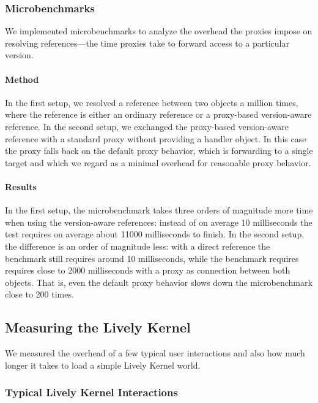 \subsubsection{Microbenchmarks}

We implemented microbenchmarks to analyze the overhead the proxies impose on resolving references---the time proxies take to forward access to a particular version.

\paragraph{Method}
In the first setup, we resolved a reference between two objects a million times, where the reference is either an ordinary reference or a proxy-based version-aware reference.
In the second setup, we exchanged the proxy-based version-aware reference with a standard proxy without providing a handler object.
In this case the proxy falls back on the default proxy behavior, which is forwarding to a single target and which we regard as a minimal overhead for reasonable proxy behavior. 

\paragraph{Results}
In the first setup, the microbenchmark takes three orders of magnitude more time when using the version-aware references: instead of on average 10 milliseconds the test requires on average about 11000 milliseconds to finish.
In the second setup, the difference is an order of magnitude less: with a direct reference the benchmark still requires around 10 milliseconds, while the benchmark requires requires close to 2000 milliseconds with a proxy as connection between both objects.
That is, even the default proxy behavior slows down the microbenchmark close to 200 times.



\subsection{Measuring the Lively Kernel}

We measured the overhead of a few typical user interactions and also how much longer it takes to load a simple Lively Kernel world.

\subsubsection{Typical Lively Kernel Interactions}

